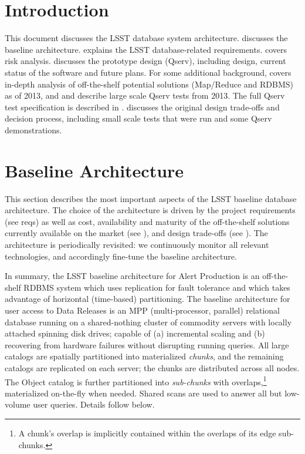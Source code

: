 \documentclass[DM,lsstdraft,toc]{lsstdoc}
\begin{document}
\section{Introduction}\label{introduction}

This document discusses the LSST database system architecture.  discusses the baseline
architecture.  explains the LSST database-related
requirements.
 covers risk analysis.
 discusses the
prototype design (Qserv), including design, current status of the
software and future plans.
For some additional background,  covers in-depth analysis
of off-the-shelf potential solutions (Map/Reduce and RDBMS) as of 2013,
and  and  describe large scale Qserv tests from 2013.
The full Qserv test specification is described in .
 discusses the original design trade-offs
and decision process, including small scale tests that were run and some Qserv demonstrations.

\section{Baseline Architecture}\label{baseline-architecture}

This section describes the most important aspects of the LSST baseline
database architecture. The choice of the architecture is driven by the
project requirements (see reqs) as well as cost, availability and
maturity of the off-the-shelf solutions currently available on the
market (see ), and design trade-offs (see
). The architecture is periodically revisited: we
continuously monitor all relevant technologies, and accordingly
fine-tune the baseline architecture.

In summary, the LSST baseline architecture for Alert Production is an
off-the-shelf RDBMS system which uses replication for fault tolerance
and which takes advantage of horizontal (time-based) partitioning. The
baseline architecture for user access to Data Releases is an MPP
(multi-processor, parallel) relational database running on a
shared-nothing cluster of commodity servers with locally attached
spinning disk drives; capable of (a) incremental scaling and (b)
recovering from hardware failures without disrupting running queries.
All large catalogs are spatially partitioned into materialized
\emph{chunks}, and the remaining catalogs are replicated on each server;
the chunks are distributed across all nodes. The Object catalog is
further partitioned into \emph{sub-chunks} with overlaps,\footnote{A
  chunk's overlap is implicitly contained within the overlaps of its
  edge sub-chunks.} materialized on-the-fly when needed. Shared scans
are used to answer all but low-volume user queries. Details follow
below.
\end{document}
